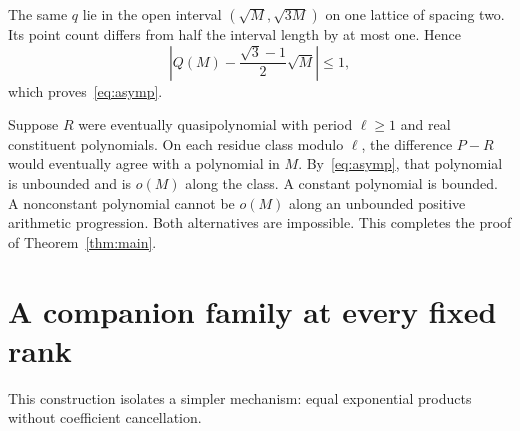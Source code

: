 \documentclass[11pt,a4paper]{article}
\begin{document}
The same $q$ lie in the open interval $(\sqrt M,\sqrt{3M})$ on one lattice
of spacing two. Its point count differs from half the interval length
by at most one. Hence
\[
 \left|Q(M)-\frac{\sqrt3-1}{2}\sqrt M\right|\le1,
\]
which proves~\eqref{eq:asymp}.

Suppose $R$ were eventually quasipolynomial with period $\ell\ge1$ and
real constituent polynomials. On each residue class modulo $\ell$, the
difference $P-R$ would eventually agree with a polynomial in $M$.
By~\eqref{eq:asymp}, that polynomial is unbounded and is $o(M)$ along the
class. A constant polynomial is bounded. A nonconstant polynomial cannot
be $o(M)$ along an unbounded positive arithmetic progression.
Both alternatives are impossible. This completes the proof of
Theorem~\ref{thm:main}.

\section{A companion family at every fixed rank}
This construction isolates a simpler mechanism: equal exponential products
without coefficient cancellation.
\end{document}
